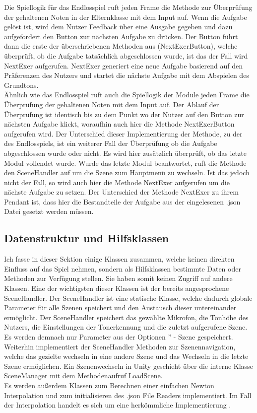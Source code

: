Die Spiellogik für das Endlosspiel ruft jeden Frame die Methode zur Überprüfung der gehaltenen Noten in der Elternklasse mit dem Input auf. Wenn die Aufgabe gelöst ist, wird dem Nutzer Feedback über eine Ausgabe gegeben und dazu aufgefordert den Button zur nächsten Aufgabe zu drücken. Der Button führt dann die erste der überschriebenen Methoden aus (NextExerButton), welche überprüft, ob die Aufgabe tatsächlich abgeschlossen wurde, ist das der Fall wird NextExer aufgerufen. NextExer generiert eine neue Aufgabe basierend auf den Präferenzen des Nutzers und startet die nächste Aufgabe mit dem Abspielen des Grundtons. \\
Ähnlich wie das Endlosspiel ruft auch die Spiellogik der Module jeden Frame die Überprüfung der gehaltenen Noten mit dem Input auf. Der Ablauf der Überprüfung ist identisch bis zu dem Punkt wo der Nutzer auf den Button zur nächsten Aufgabe klickt, woraufhin auch hier die Methode NextExerButton aufgerufen wird. Der Unterschied dieser Implementierung der Methode, zu der des Endlosspiels, ist ein weiterer Fall der Überprüfung ob die Aufgabe abgeschlossen wurde oder nicht. Es wird hier zusätzlich überprüft, ob das letzte Modul vollendet wurde. Wurde das letzte Modul beantwortet, ruft die Methode den SceneHandler auf um die Szene zum Hauptmenü zu wechseln. Ist das jedoch nicht der Fall, so wird auch hier die Methode NextExer aufgerufen um die nächste Aufgabe zu setzen. Der Unterschied der Methode NextExer zu ihrem Pendant ist, dass hier die Bestandteile der Aufgabe aus der eingelesenen .json Datei gesetzt werden müssen. 

\subsection*{Datenstruktur und Hilfsklassen}
Ich fasse in dieser Sektion einige Klassen zusammen, welche keinen direkten Einfluss auf das Spiel nehmen, sondern als Hilfsklassen bestimmte Daten oder Methoden zur Verfügung stellen. Sie haben somit keinen Zugriff auf andere Klassen. Eine der wichtigsten dieser Klassen ist der bereits angesprochene SceneHandler. Der SceneHandler ist eine statische Klasse, welche dadurch globale Parameter für alle Szenen speichert und den Austausch dieser untereinander ermöglicht. Der SceneHandler speichert das gewählte Mikrofon, die Tonhöhe des Nutzers, die Einstellungen der Tonerkennung und die zuletzt aufgerufene Szene. Es werden demnach nur Parameter aus der \glqq Optionen '' - Szene gespeichert. Weiterhin implementiert der SceneHandler Methoden zur Szenennavigation, welche das gezielte wechseln in eine andere Szene und das Wechseln in die letzte Szene ermöglichen. Ein Szenenwechseln in Unity geschieht über die interne Klasse SceneManager mit dem Methodenaufruf LoadScene. \\
Es werden außerdem Klassen zum Berechnen einer einfachen Newton Interpolation und zum initialisieren des .json File Readers implementiert. Im Fall der Interpolation handelt es sich um eine herkömmliche Implementierung \cite{newtonInterpolation}. 

